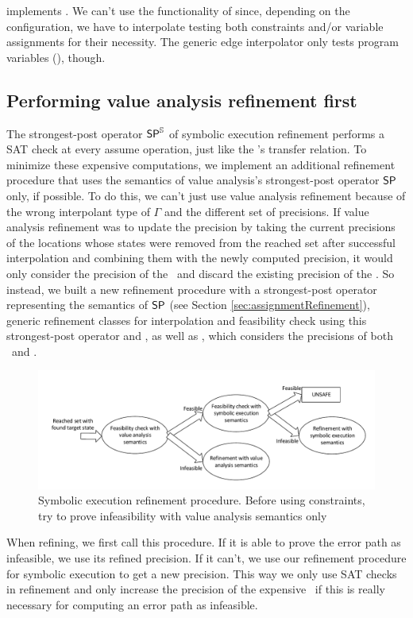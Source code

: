  implements .
We can't use the functionality of  since, depending on the configuration, we have to interpolate
testing both constraints and/or variable assignments for their necessity.
The generic edge interpolator only tests program variables (), though.

\subsection{Performing value analysis refinement first}
The strongest-post operator $\operatorname{\operatorname{\operatorname{\mathsf{SP}}}^{\mathbb{S}}}$ of symbolic execution refinement performs a SAT check at every assume operation, just like the \symbolicExecutionCPA's transfer relation.
To minimize these expensive computations, we implement an additional refinement procedure that uses the semantics of value analysis's strongest-post operator $\operatorname{\operatorname{\operatorname{\mathsf{SP}}}}$ only, if possible.
To do this, we can't just use value analysis refinement because of the wrong interpolant type of $\Gamma$ and the different set of precisions.
If value analysis refinement was to update the precision by taking the current precisions of the locations whose states were removed from the reached set after successful interpolation and combining them with the newly computed precision, it would only consider the precision of the \ and discard the existing precision of the \constraintsCPA.
So instead, we built a new refinement procedure with a strongest-post operator representing the semantics of $\operatorname{\operatorname{\operatorname{\mathsf{SP}}}}$ (see Section \ref{sec:assignmentRefinement}),  generic refinement classes for interpolation and feasibility check using this strongest-post operator and , as well as , which considers the precisions of both \ and \constraintsCPA.

\begin{figure}[t!]
\includegraphics[width=\linewidth]{implementationCegar/DelegatingRefinementFlow}
\caption{Symbolic execution refinement procedure. Before using constraints, try to prove infeasibility with value analysis semantics only}
\label{fig:delegatingRefFlow}
\end{figure}
When refining, we first call this procedure. If it is able to prove the error path as infeasible, we use its refined precision.
If it can't, we use our refinement procedure for symbolic execution to get a new precision.
This way we only use SAT checks in refinement and only increase the precision of the expensive \constraintsCPA\ if this is really necessary for computing an error path as infeasible.

